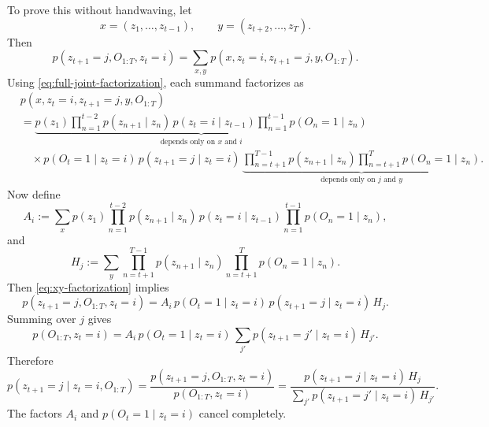 \documentclass[11pt]{article}
\begin{document}
To prove this without handwaving, let
\begin{equation}
    x=(z_1,\dots,z_{t-1}),
    \qquad
    y=(z_{t+2},\dots,z_T).
\end{equation}
Then
\begin{equation}
    p(z_{t+1}=j,O_{1:T},z_t=i)
    =
    \sum_{x,y} p(x,z_t=i,z_{t+1}=j,y,O_{1:T}).
\end{equation}
Using \eqref{eq:full-joint-factorization}, each summand factorizes as
\begin{align}
    &p(x,z_t=i,z_{t+1}=j,y,O_{1:T}) \nonumber\\
    &=
    \underbrace{
        p(z_1)\prod_{n=1}^{t-2}p(z_{n+1}\mid z_n)\,
        p(z_t=i\mid z_{t-1})
        \prod_{n=1}^{t-1}p(O_n=1\mid z_n)
    }_{\text{depends only on }x\text{ and }i}
    \nonumber\\
    &\quad\times
    p(O_t=1\mid z_t=i)\,
    p(z_{t+1}=j\mid z_t=i)\,
    \underbrace{
        \prod_{n=t+1}^{T-1}p(z_{n+1}\mid z_n)
        \prod_{n=t+1}^{T}p(O_n=1\mid z_n)
    }_{\text{depends only on }j\text{ and }y}.
    \label{eq:xy-factorization}
\end{align}
Now define
\begin{equation}
    A_i
    :=
    \sum_x
    p(z_1)\prod_{n=1}^{t-2}p(z_{n+1}\mid z_n)\,
    p(z_t=i\mid z_{t-1})
    \prod_{n=1}^{t-1}p(O_n=1\mid z_n),
\end{equation}
and
\begin{equation}
    H_j
    :=
    \sum_y
    \prod_{n=t+1}^{T-1}p(z_{n+1}\mid z_n)
    \prod_{n=t+1}^{T}p(O_n=1\mid z_n).
\end{equation}
Then \eqref{eq:xy-factorization} implies
\begin{equation}
    p(z_{t+1}=j,O_{1:T},z_t=i)
    =
    A_i\,
    p(O_t=1\mid z_t=i)\,
    p(z_{t+1}=j\mid z_t=i)\,
    H_j.
    \label{eq:joint-factor-numerator}
\end{equation}
Summing over \(j\) gives
\begin{equation}
    p(O_{1:T},z_t=i)
    =
    A_i\,
    p(O_t=1\mid z_t=i)\,
    \sum_{j'} p(z_{t+1}=j'\mid z_t=i)\,H_{j'}.
\end{equation}
Therefore
\begin{equation}
    p(z_{t+1}=j\mid z_t=i,O_{1:T})
    =
    \frac{
        p(z_{t+1}=j, O_{1:T}, z_t=i)
    }{
        p(O_{1:T}, z_t=i)
    }
    =
    \frac{
        p(z_{t+1}=j\mid z_t=i)\,H_j
    }{
        \sum_{j'} p(z_{t+1}=j'\mid z_t=i)\,H_{j'}
    }.
    \label{eq:reduced-fraction}
\end{equation}
The factors \(A_i\) and \(p(O_t=1\mid z_t=i)\) cancel completely.
\end{document}
